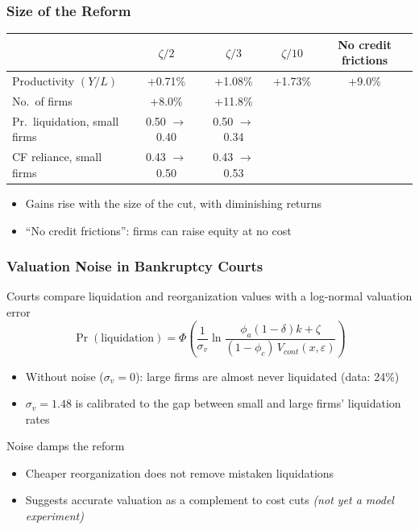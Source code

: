 \documentclass[aspectratio=169,xcolor=table]{beamer}
\begin{document}
\begin{frame}[label=reformsize] \frametitle{Size of the Reform \hfill \hyperlink{effects}{}}

\footnotesize
\begin{table}[H]
\centering
\renewcommand{\arraystretch}{0.9}
\begin{tabular}{lcccc}
\toprule
 & $\zeta/2$ & $\zeta/3$ & $\zeta/10$ & \textbf{No credit frictions} \\
\midrule
Productivity $(Y/L)$         & +0.71\% & +1.08\% & +1.73\% & +9.0\% \\
No.\ of firms                & +8.0\% & +11.8\% & & \\
Pr.\ liquidation, small firms & 0.50 $\to$ 0.40 & 0.50 $\to$ 0.34 & & \\
CF reliance, small firms     & 0.43 $\to$ 0.50 & 0.43 $\to$ 0.53 & & \\
\bottomrule
\end{tabular}
\end{table}
\normalsize
\begin{itemize} \small
    \item Gains rise with the size of the cut, with diminishing returns
    \item ``No credit frictions'': firms can raise equity at no cost
\end{itemize}

\end{frame}

\begin{frame}[label=noise] \frametitle{Valuation Noise in Bankruptcy Courts \hfill \hyperlink{LiqReorg2}{}}

Courts compare liquidation and reorganization values with a log-normal valuation error
\[
\Pr(\text{liquidation}) = \Phi\left( \frac{1}{\sigma_v} \ln \frac{\phi_a(1-\delta)k + \zeta}{(1-\phi_c)\,V_{cont}(x,\varepsilon)} \right)
\]
\begin{itemize} \small
    \item Without noise ($\sigma_v = 0$): large firms are almost never liquidated (data: 24\%)
    \item $\sigma_v = 1.48$ is calibrated to the gap between small and large firms' liquidation rates
\end{itemize} \vspace{3mm}

Noise damps the reform
\begin{itemize} \small
    \item Cheaper reorganization does not remove mistaken liquidations
    \item Suggests accurate valuation as a complement to cost cuts \textit{(not yet a model experiment)}
\end{itemize}

\end{frame}
\end{document}
